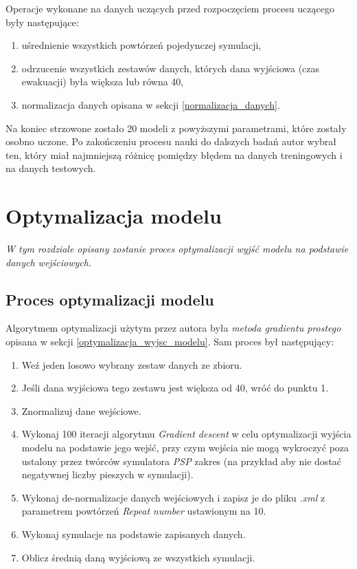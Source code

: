 \documentclass[12pt]{aghdpl}
\begin{document}
		Operacje wykonane na danych uczących przed rozpoczęciem procesu uczącego były następujące:
		\begin{enumerate}
		\item uśrednienie wszystkich powtórzeń pojedynczej symulacji,
		\item odrzucenie wszystkich zestawów danych, których dana wyjściowa (czas ewakuacji) była większa lub równa 40,
		\item normalizacja danych opisana w sekcji \ref{normalizacja_danych}.		
		\end{enumerate}
		
		Na koniec strzowone zostało 20 modeli z powyższymi parametrami, które zostały osobno uczone. Po zakończeniu procesu nauki do dalszych badań autor wybrał ten, który miał najmniejszą różnicę pomiędzy błędem na danych treningowych i na danych testowych.
		
	\chapter{Optymalizacja modelu}
	\textit{W tym rozdziale opisany zostanie proces optymalizacji wyjść modelu na podstawie danych wejściowych.}

		\section{Proces optymalizacji modelu}
		Algorytmem optymalizacji użytym przez autora była \textit{metoda gradientu prostego} opisana w sekcji \ref{optymalizacja_wyjsc_modelu}. Sam proces był następujący:
		\begin{enumerate}
		\item Weź jeden losowo wybrany zestaw danych ze zbioru.
		\item Jeśli dana wyjściowa tego zestawu jest większa od 40, wróć do punktu 1.
		\item Znormalizuj dane wejściowe.
		\item Wykonaj 100 iteracji algorytmu \textit{Gradient descent} w celu optymalizacji wyjścia modelu na podstawie jego wejść, przy czym wejścia nie mogą wykroczyć poza ustalony przez twórców symulatora \textit{PSP} zakres (na przykład aby nie dostać negatywnej liczby pieszych w symulacji).
		\item Wykonaj de-normalizacje danych wejściowych i zapisz je do pliku \textit{.xml} z parametrem powtórzeń \textit{Repeat number} ustawionym na 10.
		\item Wykonaj symulacje na podstawie zapisanych danych.
		\item Oblicz średnią daną wyjściową ze wszystkich symulacji.
		\end{enumerate}
		
\end{document}
